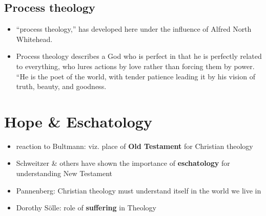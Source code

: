\documentclass[11pt]{article}
\begin{document}
\subsection*{Process theology}
\label{process-theology}
\begin{itemize}
\item “process theology,” has developed here under the influence of Alfred North Whitehead.
\item Process theology describes a God who is perfect in that he is perfectly related to everything, who lures actions by love rather than forcing them by power. “He is the poet of the world, with tender patience leading it by his vision of truth, beauty, and goodness.
\end{itemize}

\section*{Hope \& Eschatology}
\label{hope--eschatology}
\begin{itemize}
\item reaction to Bultmann: viz. place of \textbf{Old Testament} for Christian theology
\item Schweitzer \& others have shown the importance of \textbf{eschatology} for understanding New Testament
\item Pannenberg: Christian theology must understand itself in the world we live in
\item Dorothy Sölle: role of \textbf{suffering} in Theology
\end{itemize}
\end{document}
